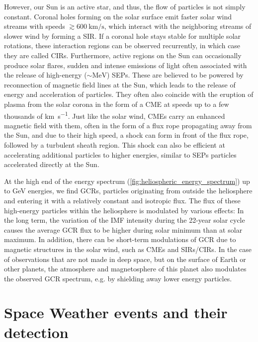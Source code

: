 However, our Sun is an active star, and thus, the flow of particles is not simply constant.
Coronal holes forming on the solar surface emit faster solar wind streams with speeds $\gtrsim \SI{600}{\kilo\meter\per\second}$, which interact with the neighboring streams of slower wind by forming a \ac{SIR}. If a coronal hole stays stable for multiple solar rotations, these interaction regions can be observed recurrently, in which case they are called \acp{CIR}.
Furthermore, active regions on the Sun can occasionally produce solar flares, sudden and intense emissions of light often associated with the release of high-energy ($\sim \si{\mega\electronvolt}$) \acp{SEP}.
These are believed to be powered by reconnection of magnetic field lines at the Sun, which leads to the release of energy and acceleration of particles.
They often also coincide with the eruption of plasma from the solar corona in the form of a \ac{CME} at speeds up to a few thousands of \si{\kilo\meter\per\second}.
Just like the solar wind, \acp{CME} carry an enhanced magnetic field with them, often in the form of a flux rope propagating away from the Sun, and due to their high speed, a shock can form in front of the flux rope, followed by a turbulent sheath region.
This shock can also be efficient at accelerating additional particles to higher energies, similar to \acp{SEP} particles accelerated directly at the Sun.

At the high end of the energy spectrum (\autoref{fig:heliospheric_energy_spectrum}) up to \si{\giga\electronvolt} energies, we find \acp{GCR}, particles originating from outside the heliosphere and entering it with a relatively constant and isotropic flux. 
The flux of these high-energy particles within the heliosphere is modulated by various effects: In the long term, the variation of the \ac{IMF} intensity during the 22-year solar cycle causes the average GCR flux to be higher during solar minimum than at solar maximum. In addition, there can be short-term modulations of \ac{GCR} due to magnetic structures in the solar wind, such as \acp{CME} and \acp{SIR}/\acp{CIR}. In the case of observations that are not made in deep space, but on the surface of Earth or other planets, the atmosphere and magnetosphere of this planet also modulates the observed \ac{GCR} spectrum, e.g. by shielding away lower energy particles. 


\section{Space Weather events and their detection}

